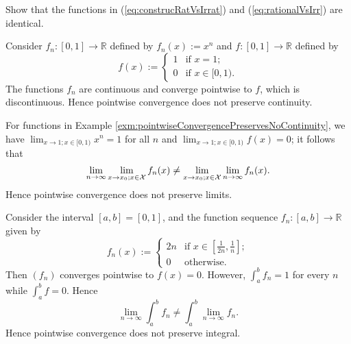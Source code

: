 \begin{exc}
  Show that the functions in (\ref{eq:construcRatVsIrrat})
  and (\ref{eq:rationalVsIrr}) are identical. 
\end{exc}


\begin{exm}
  \label{exm:pointwiseConvergencePreservesNoContinuity}
  Consider $f_n:[0,1]\rightarrow \mathbb{R}$
   defined by \mbox{$f_n(x) := x^n$}
   and $f:[0,1]\rightarrow \mathbb{R}$
   defined by 
   \begin{displaymath}
     f(x) :=
     \begin{cases}
       1 & \text{if } x=1;
       \\
       0 & \text{if } x\in [0,1).
     \end{cases}
   \end{displaymath}
  The functions $f_n$ are continuous
   and converge pointwise to $f$,
   which is discontinuous.
  Hence pointwise convergence
   does not preserve continuity.
\end{exm}

\begin{exm}
  \label{exm:pointwiseConvergencePreservesNoLimits}
  For functions
  in Example \ref{exm:pointwiseConvergencePreservesNoContinuity},
   we have \mbox{$\lim_{x\rightarrow 1; x\in [0,1)} x^n=1$} for all $n$
   and $\lim_{x\rightarrow 1; x\in [0,1)} f(x) =0$; 
   it follows that
   \begin{displaymath}
     \lim_{n\rightarrow\infty}\lim_{x\rightarrow x_0; x\in {\cal X}} f_n(x)
     \ne 
     \lim_{x\rightarrow x_0; x\in {\cal X}}\lim_{n\rightarrow\infty} f_n(x).
   \end{displaymath}
  Hence pointwise convergence does not preserve limits.
\end{exm}

\begin{exm}
  \label{exm:pointwiseConvergencePreservesNoIntegral}
  Consider the interval $[a,b]=[0,1]$,
  and the function sequence $f_n:[a,b]\rightarrow\mathbb{R}$
  given by
   \begin{displaymath}
     f_n(x) := 
     \begin{cases}
       2n & \text{if } x\in \left[\frac{1}{2n}, \frac{1}{n}\right];
       \\
       0  & \text{otherwise}.
     \end{cases}
   \end{displaymath}
  Then $(f_n)$ converges pointwise to $f(x)=0$.
  However, $\int_a^b f_n = 1$ for every $n$
   while $\int_a^b f = 0$. Hence
   \begin{displaymath}
     \lim_{n\rightarrow \infty} \int_{a}^b f_n
     \ne \int_a^b \lim_{n\rightarrow \infty} f_n.
   \end{displaymath}
  Hence pointwise convergence does not preserve integral.
\end{exm}

